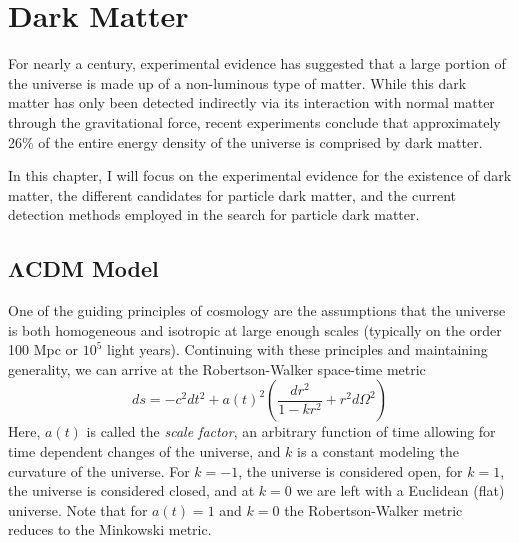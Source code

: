 

\pagestyle{cu}
\graphicspath{{./Chapter1/images/}}

\chapter[Dark Matter][Dark Matter]{Dark Matter}

For nearly a century, experimental evidence has suggested that a large portion of the universe is made up of a non-luminous type of matter.  While this dark matter has only been detected indirectly via its interaction with normal matter through the gravitational force, recent experiments conclude that approximately 26\% of the entire energy density of the universe is comprised by dark matter.

	In this chapter, I will focus on the experimental evidence for the existence of dark matter, the different candidates for particle dark matter, and the current detection methods employed in the search for particle dark matter.
	
	
\section[$\Lambda$CDM Model][$\Lambda$CDM Model]{$\boldsymbol{\Lambda}$CDM Model}
\label{sec:cdm}

	One of the guiding principles of cosmology are the assumptions that the universe is both homogeneous and isotropic at large enough scales (typically on the order 100 Mpc or $10^{5}$ light years).  Continuing with these principles and maintaining generality, we can arrive at the Robertson-Walker space-time metric
	\begin{equation}
		ds = -c^{2}dt^{2} + a(t)^{2}\left( \dfrac{dr^{2}}{1 - kr^{2}} + r^{2}d\Omega^{2}\right)
	\end{equation}
Here, $a(t)$ is called the \emph{scale factor}, an arbitrary function of time allowing for time dependent changes of the universe, and $k$ is a constant modeling the curvature of the universe.  For $k=-1$, the universe is considered open, for $k=1$, the universe is considered closed, and at $k=0$ we are left with a Euclidean (flat) universe.  Note that for $a(t) = 1$ and $k = 0$ the Robertson-Walker metric reduces to the Minkowski metric.


